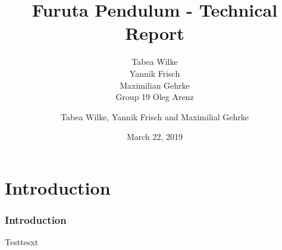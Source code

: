 \documentclass[accentcolor=tud1d,colorbacktitle,inverttitle,landscape,german,presentation,t]{tudbeamer}
\begin{document}
	
	\title[Furuta Pendulum]{Furuta Pendulum - Technical Report}
	\subtitle{Tabea Wilke\\Yannik Frisch\\Maximilian Gehrke \\Group 19 Oleg 
	Arenz}
	
	\author[Tabea Wilke et al.]{Tabea Wilke, Yannik Frisch and Maximilial 
	Gehrke}
	
	
	\date{March 22, 2019}
	

\begin{titleframe}
\end{titleframe}
\section{Introduction}
	\begin{frame}
		\frametitle{Introduction}
		Testtesxt
	\end{frame}
\end{document}
